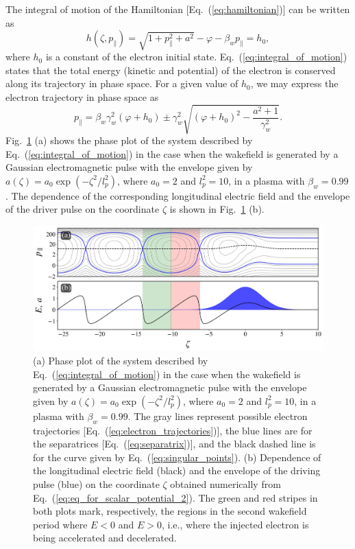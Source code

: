 \documentclass[10pt, a4paper, twoside, openright]{report}
\begin{document}
The integral of motion of the Hamiltonian [Eq.~(\ref{eq:hamiltonian})] can be written as \cite{Esirkepov2006, Esarey2009, Bulanov2013}
\begin{equation}\label{eq:integral_of_motion}
	h\left( \zeta, p_{\parallel} \right) = \sqrt{1 + p_{\parallel}^2 + a^2} - \varphi - \beta_w p_{\parallel} = h_0,
\end{equation}
where $ h_0 $ is a constant of the electron initial state. Eq.~(\ref{eq:integral_of_motion}) states that the total energy (kinetic and potential) of the electron is conserved along its trajectory in phase space. For a given value of $ h_0 $, we may express the electron trajectory in phase space as \cite{Schroeder2006, Esarey2009}
\begin{equation}\label{eq:electron_trajectories}
p_{\parallel} = \beta_w \gamma_w^2 \left( \varphi + h_0 \right) \pm \gamma_w^2 \sqrt{\left( \varphi + h_0 \right)^2 - \frac{a^2 + 1}{\gamma_w^2}}.
\end{equation}
Fig.~\ref{fig:phase_plot} (a) shows the phase plot of the system described by Eq.~(\ref{eq:integral_of_motion}) in the case when the wakefield is generated by a Gaussian electromagnetic pulse with the envelope given by $ a \left( \zeta \right) = a_0 \exp \left( -\zeta^2 / l_p^2 \right) $, where $ a_0 = 2 $ and $ l_p^2 = 10 $, in a plasma with $ \beta_w = 0.99 $. The dependence of the corresponding longitudinal electric field and the envelope of the driver pulse on the coordinate $ \zeta $ is shown in Fig.~\ref{fig:phase_plot} (b). 

\begin{figure}[t]
	\includegraphics[width=0.9\linewidth]{img/phase_plot.jpg}
	\caption[]{\label{fig:phase_plot} (a) Phase plot of the system described by Eq.~(\ref{eq:integral_of_motion}) in the case when the wakefield is generated by a Gaussian electromagnetic pulse with the envelope given by $ a \left( \zeta \right) = a_0 \exp \left( -\zeta^2 / l_p^2 \right) $, where $ a_0 = 2 $ and $ l_p^2 = 10 $, in a plasma with $ \beta_w = 0.99 $. The gray lines represent possible electron trajectories [Eq.~(\ref{eq:electron_trajectories})], the blue lines are for the separatrices [Eq.~(\ref{eq:separatrix})], and the black dashed line is for the curve given by Eq.~(\ref{eq:singular_points}). (b) Dependence of the longitudinal electric field (black) and the envelope of the driving pulse (blue) on the coordinate $ \zeta $ obtained numerically from Eq.~(\ref{eq:eq_for_scalar_potential_2}). The green and red stripes in both plots mark, respectively, the regions in the second wakefield period where $ E < 0 $ and $ E > 0 $, i.e., where the injected electron is being accelerated and decelerated.}
\end{figure}
\end{document}
